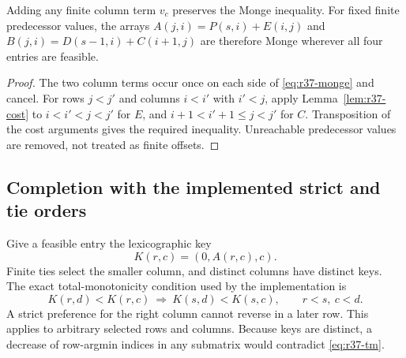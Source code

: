\begin{lemma}\label{lem:r37-offset}
Adding any finite column term $v_c$ preserves the Monge inequality. For fixed finite predecessor values, the arrays $A(j,i)=P(s,i)+E(i,j)$ and $B(j,i)=D(s-1,i)+C(i+1,j)$ are therefore Monge wherever all four entries are feasible.
\end{lemma}
\begin{proof}
The two column terms occur once on each side of \eqref{eq:r37-monge} and cancel. For rows $j<j'$ and columns $i<i'$ with $i'<j$, apply Lemma~\ref{lem:r37-cost} to $i<i'<j<j'$ for $E$, and $i+1<i'+1\leq j<j'$ for $C$. Transposition of the cost arguments gives the required inequality. Unreachable predecessor values are removed, not treated as finite offsets.
\end{proof}

\subsection{Completion with the implemented strict and tie orders}
Give a feasible entry the lexicographic key
\begin{equation}\label{eq:r37-finite-key}
 K(r,c)=(0,A(r,c),c).
\end{equation}
Finite ties select the smaller column, and distinct columns have distinct keys. The exact total-monotonicity condition used by the implementation is
\begin{equation}\label{eq:r37-tm}
 K(r,d)<K(r,c)\ \Longrightarrow\ K(s,d)<K(s,c),\qquad r<s,\ c<d.
\end{equation}
A strict preference for the right column cannot reverse in a later row. This applies to arbitrary selected rows and columns. Because keys are distinct, a decrease of row-argmin indices in any submatrix would contradict \eqref{eq:r37-tm}.

